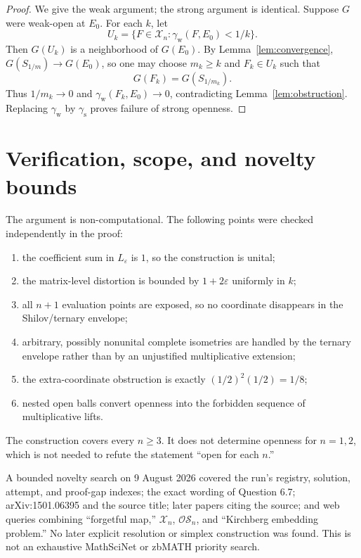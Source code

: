 \documentclass[11pt]{article}
\newcommand{\Xc}{\mathcal X}
\newcommand{\OS}{\mathcal{OS}}
\newcommand{\eps}{\varepsilon}
\newcommand{\gamw}{\gamma_{\mathrm w}}
\newcommand{\gams}{\gamma_{\mathrm s}}
\begin{document}
\begin{proof}
We give the weak argument; the strong argument is identical. Suppose $G$ were
weak-open at $E_0$. For each $k$, let
\[
U_k=\{F\in\Xc_n:\gamw(F,E_0)<1/k\}.
\]
Then $G(U_k)$ is a neighborhood of $G(E_0)$. By
Lemma~\ref{lem:convergence}, $G(S_{1/m})\to G(E_0)$, so one may choose
$m_k\geq k$ and $F_k\in U_k$ such that
\[
G(F_k)=G(S_{1/m_k}).
\]
Thus $1/m_k\to0$ and $\gamw(F_k,E_0)\to0$, contradicting
Lemma~\ref{lem:obstruction}. Replacing $\gamw$ by $\gams$ proves failure of
strong openness.
\end{proof}

\section{Verification, scope, and novelty bounds}

The argument is non-computational. The following points were checked
independently in the proof:
\begin{enumerate}
\item the coefficient sum in $L_\eps$ is $1$, so the construction is unital;
\item the matrix-level distortion is bounded by $1+2\eps$ uniformly in $k$;
\item all $n+1$ evaluation points are exposed, so no coordinate disappears
      in the Shilov/ternary envelope;
\item arbitrary, possibly nonunital complete isometries are handled by the
      ternary envelope rather than by an unjustified multiplicative extension;
\item the extra-coordinate obstruction is exactly $(1/2)^2(1/2)=1/8$;
\item nested open balls convert openness into the forbidden sequence of
      multiplicative lifts.
\end{enumerate}

The construction covers every $n\geq3$. It does not determine openness for
$n=1,2$, which is not needed to refute the statement ``open for each $n$.''

A bounded novelty search on 9 August 2026 covered the run's registry,
solution, attempt, and proof-gap indexes; the exact wording of Question 6.7;
arXiv:1501.06395 and the source title; later papers citing the source; and web
queries combining ``forgetful map,'' $\Xc_n$, $\OS_n$, and ``Kirchberg
embedding problem.'' No later explicit resolution or simplex construction was
found. This is not an exhaustive MathSciNet or zbMATH priority search.
\end{document}
